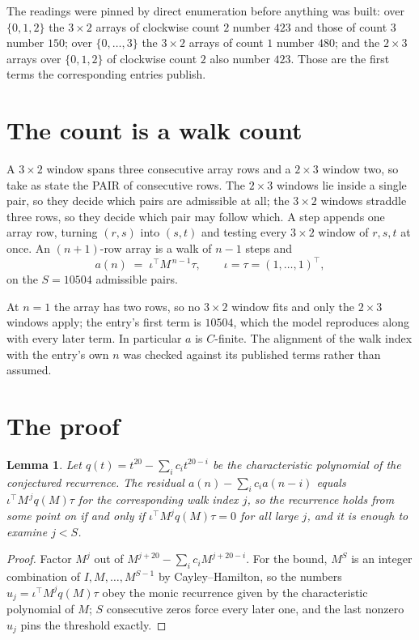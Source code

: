 \documentclass[11pt,a4paper]{article}
\theoremstyle{plain}
\newtheorem{lemma}[theorem]{Lemma}
\theoremstyle{definition}
\begin{document}
The readings were pinned by direct enumeration before anything was built: over
$\{0,1,2\}$ the $3\times2$ arrays of clockwise count $2$ number $423$ and those of count
$3$ number $150$; over $\{0,\dots,3\}$ the $3\times2$ arrays of count $1$ number $480$;
and the $2\times3$ arrays over $\{0,1,2\}$ of clockwise count $2$ also number $423$. Those
are the first terms the corresponding entries publish.

\section{The count is a walk count}

A $3\times2$ window spans three consecutive array rows and a $2\times3$
window two, so take as state the PAIR of consecutive rows. The $2\times3$ windows lie inside a
single pair, so they decide which pairs are admissible at all; the $3\times2$ windows straddle
three rows, so they decide which pair may follow which. A step appends one array row, turning
$(r,s)$ into $(s,t)$ and testing every $3\times2$ window of $r,s,t$ at once. An $(n+1)$-row
array is a walk of $n-1$ steps and
\[
a(n)\;=\;\iota^{\!\top}M^{\,n-1}\tau,\qquad\iota=\tau=(1,\dots,1)^{\!\top},
\]
on the $S=10504$ admissible pairs.

At $n=1$ the array has two rows, so no $3\times2$ window fits and only the
$2\times3$ windows apply; the entry's first term is
$10504$, which the model reproduces along with every later term.
In particular $a$ is $C$-finite. The alignment of the walk index with the entry's own $n$ was
checked against its published terms rather than assumed.

\section{The proof}

\begin{lemma}\label{lem:crit}
Let $q(t)=t^{20}-\sum_i c_it^{20-i}$ be the characteristic polynomial of the
conjectured recurrence. The residual $a(n)-\sum_ic_ia(n-i)$ equals
$\iota^{\!\top}M^{\,j}q(M)\tau$ for the corresponding walk index $j$, so the recurrence
holds from some point on if and only if $\iota^{\!\top}M^{j}q(M)\tau=0$ for all large $j$,
and it is enough to examine $j<S$.
\end{lemma}

\begin{proof}
Factor $M^{j}$ out of $M^{j+20}-\sum_ic_iM^{j+20-i}$. For the bound, $M^{S}$
is an integer combination of $I,M,\dots,M^{S-1}$ by Cayley--Hamilton, so the numbers
$u_j=\iota^{\!\top}M^{j}q(M)\tau$ obey the monic recurrence given by the characteristic
polynomial of $M$; $S$ consecutive zeros force every later one, and the last nonzero $u_j$
pins the threshold exactly.
\end{proof}
\end{document}
